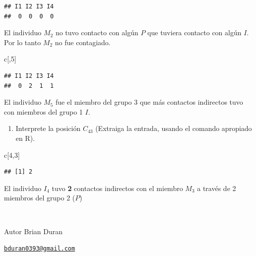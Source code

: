 \documentclass[]{article}
\newenvironment{Shaded}{\begin{snugshade}}{\end{snugshade}}
\newcommand{\DecValTok}[1]{\textcolor[rgb]{0.00,0.00,0.81}{#1}}
\newcommand{\NormalTok}[1]{#1}
\providecommand{\tightlist}{%
  \setlength{\itemsep}{0pt}\setlength{\parskip}{0pt}}
\begin{document}
\begin{verbatim}
## I1 I2 I3 I4 
##  0  0  0  0
\end{verbatim}

El individuo \(M_{2}\) no tuvo contacto con algún \(P\) que tuviera
contacto con algún \(I\). Por lo tanto \(M_{2}\) no fue contagiado.

\begin{Shaded}
\begin{Highlighting}[]
\NormalTok{c[,}\DecValTok{5}\NormalTok{]}
\end{Highlighting}
\end{Shaded}

\begin{verbatim}
## I1 I2 I3 I4 
##  0  2  1  1
\end{verbatim}

El individuo \(M_{5}\) fue el miembro del grupo 3 que más contactos
indirectos tuvo con miembros del grupo 1 \(I\).

\begin{enumerate}
\def\labelenumi{\alph{enumi}.}
\setcounter{enumi}{4}
\tightlist
\item
  Interprete la posición \(C_{43}\) (Extraiga la entrada, usando el
  comando apropiado en R).
\end{enumerate}

\begin{Shaded}
\begin{Highlighting}[]
\NormalTok{c[}\DecValTok{4}\NormalTok{,}\DecValTok{3}\NormalTok{]}
\end{Highlighting}
\end{Shaded}

\begin{verbatim}
## [1] 2
\end{verbatim}

El individuo \(I_4\) tuvo \textbf{2} contactos indirectos con el miembro
\(M_3\) a través de 2 miembros del grupo 2 (\(P\))

~

Autor Brian Duran

{\href{mailto:bduran0393@gmail.com}{\nolinkurl{bduran0393@gmail.com}}}

~
\end{document}
